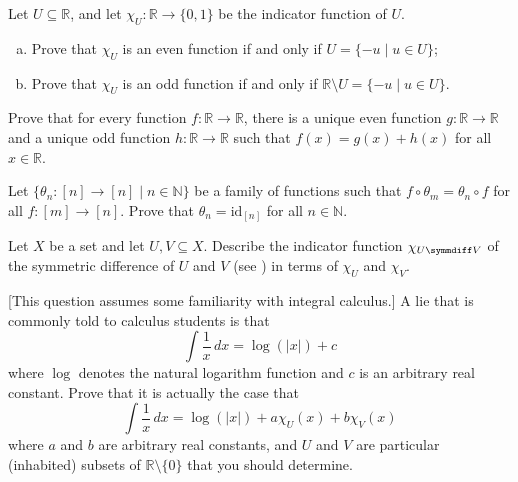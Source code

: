 \begin{chapex}
Let $U \subseteq \mathbb{R}$, and let $\chi_U : \mathbb{R} \to \{0,1\}$ be the indicator function of $U$.
\begin{enumerate}[(a)]
\item Prove that $\chi_U$ is an even function if and only if $U = \{ -u \mid u \in U \}$;
\item Prove that $\chi_U$ is an odd function if and only if $\mathbb{R} \setminus U = \{ -u \mid u \in U \}$.
\end{enumerate}
\end{chapex}

\begin{chapex}
Prove that for every function $f : \mathbb{R} \to \mathbb{R}$, there is a unique even function $g : \mathbb{R} \to \mathbb{R}$ and a unique odd function $h : \mathbb{R} \to \mathbb{R}$ such that $f(x)=g(x)+h(x)$ for all $x \in \mathbb{R}$.
\end{chapex}

\begin{chapex}
Let $\{ \theta_n : [n] \to [n] \mid n \in \mathbb{N} \}$ be a family of functions such that $f \circ \theta_m = \theta_n \circ f$ for all $f : [m] \to [n]$. Prove that $\theta_n = \mathrm{id}_{[n]}$ for all $n \in \mathbb{N}$.
\end{chapex}

\begin{chapex}
Let $X$ be a set and let $U, V \subseteq X$. Describe the indicator function $\chi_{U \symmdiff V}$ of the symmetric difference of $U$ and $V$ (see ) in terms of $\chi_U$ and $\chi_V$.
\end{chapex}

\begin{chapex}
\label{cqAntiderivativeOfLogarithm}
[This question assumes some familiarity with 
integral calculus.] A lie that is commonly told to calculus students is that
\[ \int \dfrac{1}{x} \, dx = \log(|x|) + c \]
where $\log$ denotes the natural logarithm function and $c$ is an arbitrary real constant. Prove that it is actually the case that
\[ \int \dfrac{1}{x} \, dx = \log(|x|) + a \chi_U(x) + b \chi_V(x) \]
where $a$ and $b$ are arbitrary real constants, and $U$ and $V$ are particular (inhabited) subsets of $\mathbb{R} \setminus \{ 0 \}$ that you should determine.
\end{chapex}

